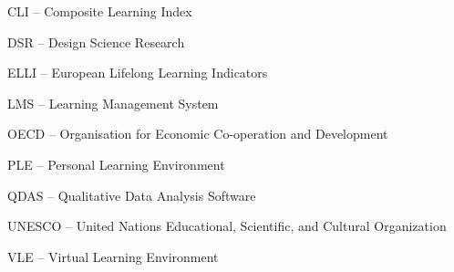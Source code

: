 CLI -- Composite Learning Index

DSR -- Design Science Research

ELLI -- European Lifelong Learning Indicators

LMS -- Learning Management System

OECD -- Organisation for Economic Co-operation and Development

PLE -- Personal Learning Environment

QDAS -- Qualitative Data Analysis Software

UNESCO -- United Nations Educational, Scientific, and Cultural Organization

VLE -- Virtual Learning Environment




